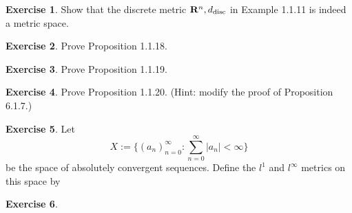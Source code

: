 \documentclass[13pt,a4paper]{report}
\theoremstyle{definition}
\newtheorem{exercise}{Exercise}[section]
\begin{document}
\begin{exercise}
Show that the discrete metric ${\bf R}^n, d_{\text{disc}}$ in Example 1.1.11 is indeed a metric
space.
\end{exercise}

\begin{exercise}
Prove Proposition 1.1.18.
\end{exercise}

\begin{exercise}
Prove Proposition 1.1.19.
\end{exercise}

\begin{exercise}
Prove Proposition 1.1.20. (Hint: modify the proof of Proposition 6.1.7.)
\end{exercise}

\begin{exercise}
Let
    \begin{equation*}
    X := \Bigg\{ (a_n)_{n = 0}^\infty : \sum_{n = 0}^\infty |a_n| < \infty \Bigg\}
    \end{equation*}
be the space of absolutely convergent sequences. Define the $l^1$ and $l^\infty$ metrics on this
space by
    \begin{equation*}

    \end{equation*}
\end{exercise}

\begin{exercise}
\end{exercise}
\end{document}
